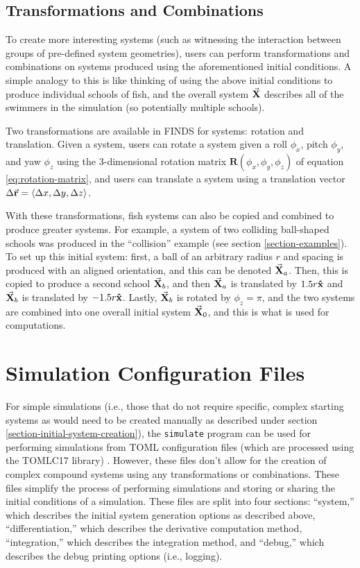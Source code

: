\documentclass[letterpaper, 10pt, twoside]{LTJournalArticle}
\begin{document}
\subsection{Transformations and Combinations}
\label{subsection-transformations-and-combinations}

To create more interesting systems (such as witnessing the interaction between
groups of pre-defined system geometries), users can perform transformations and
combinations on systems produced using the aforementioned initial conditions. A
simple analogy to this is like thinking of using the above initial conditions
to produce individual schools of fish, and the overall system $\va{X}$ describes
all of the swimmers in the simulation (so potentially multiple schools).

Two transformations are available in FINDS for systems: rotation and
translation. Given a system, users can rotate a system given a roll $\phi_x$,
pitch $\phi_y$, and yaw $\phi_z$ using the 3-dimensional rotation matrix
$\mathbf{R}(\phi_x, \phi_y, \phi_z)$ of equation \ref{eq:rotation-matrix},
and users can translate a system using a translation vector
$\Delta \va{r} = \langle \Delta x, \Delta y, \Delta z \rangle$.

With these transformations, fish systems can also be copied and combined to
produce greater systems. For example, a system of two colliding ball-shaped
schools was produced in the ``collision'' example (see section
\ref{section-examples}). To set up this initial system: first, a ball of an
arbitrary radius $r$ and spacing is produced with an aligned orientation, and
this can be denoted $\va{X}_a$. Then, this is copied to produce a second school
$\va{X}_b$, and then $\va{X}_a$ is translated by $1.5r \vu{x}$ and $\va{X}_b$ is
translated by $-1.5r \vu{x}$. Lastly, $\va{X}_b$ is rotated by $\phi_z = \pi$,
and the two systems are combined into one overall initial system $\va{X}_0$, and
this is what is used for computations.

\section{Simulation Configuration Files}
\label{section-simulation-config-files}

For simple simulations (i.e., those that do not require specific, complex
starting systems as would need to be created manually as described under
section \ref{section-initial-system-creation}), the \texttt{simulate} program
can be used for performing simulations from TOML configuration files (which are
processed using the TOMLC17 library) \cite{toml_2026, tomlc17_2026}. However,
these files don't allow for the creation of complex compound systems using any
transformations or combinations. These files simplify the process of performing
simulations and storing or sharing the initial conditions of a simulation.
These files are split into four sections: ``system,'' which describes the
initial system generation options as described above, ``differentiation,''
which describes the derivative computation method, ``integration,'' which
describes the integration method, and ``debug,'' which describes the debug
printing options (i.e., logging).
\end{document}
